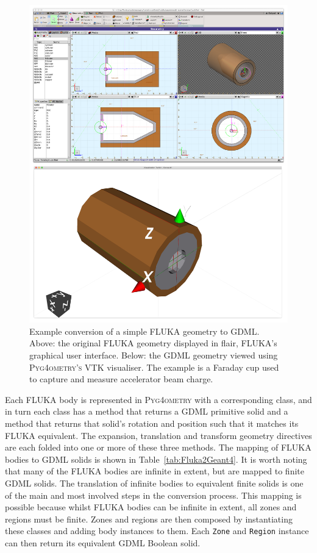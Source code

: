 \documentclass[final,5p,times,twocolumn]{elsarticle}
\newcommand{\pyinline}[1]{\lstinline[postbreak={}]{#1}}
\newcommand{\PYGEOMETRY}{\textsc{Pyg4ometry}}
\newcommand{\PYGEOMETRYPOS}{\textsc{Pyg4ometry's}} %
\begin{document}
\begin{figure}[htbp]
\begin{center}
\includegraphics[width=0.9\columnwidth]{./model-scene/faradayCup2.pdf}
\caption{Example conversion of a simple FLUKA geometry to GDML. Above:
  the original FLUKA geometry displayed in flair, FLUKA's graphical user interface.
  Below: the GDML geometry viewed using \PYGEOMETRYPOS{} VTK visualiser. The example is a Faraday cup used to capture
and measure accelerator beam charge.}
\label{fig:fluka-to-geant4-cup}
\end{center}
\end{figure}

Each FLUKA body is represented in \PYGEOMETRY{} with a corresponding class,
and in turn each class has a method that returns a GDML primitive solid and
a method that returns that solid's rotation and position such that it
matches its FLUKA equivalent.  The expansion, translation and transform
geometry directives are each folded into one or more of these three
methods.  The mapping of FLUKA bodies to GDML solids is shown in
Table~\ref{tab:Fluka2Geant4}.  It is worth noting that many of the FLUKA
bodies are infinite in extent, but are mapped to finite GDML solids.  The
translation of infinite bodies to equivalent finite solids is one of the
main and most involved steps in the conversion process.  This mapping is
possible because whilst FLUKA bodies can be infinite in extent, all zones
and regions must be finite.  Zones and regions are then composed by
instantiating these classes and adding body instances to them.  Each
\pyinline{Zone} and \pyinline{Region} instance can then return its
equivalent GDML Boolean solid.
\end{document}
